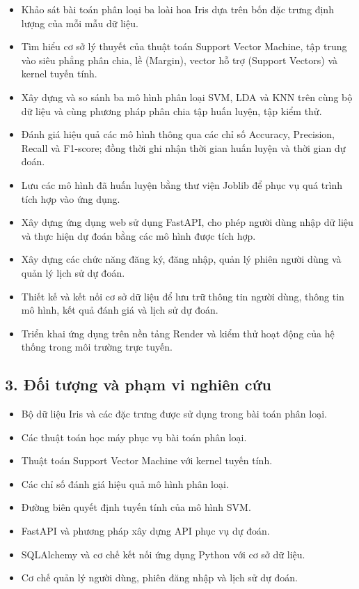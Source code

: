 \documentclass[14pt]{extarticle}
\begin{document}
\begin{itemize}
	\item Khảo sát bài toán phân loại ba loài hoa Iris dựa trên bốn đặc trưng định lượng của mỗi mẫu dữ liệu.
	
	\item Tìm hiểu cơ sở lý thuyết của thuật toán Support Vector Machine, tập trung vào siêu phẳng phân chia, lề (Margin), vector hỗ trợ (Support Vectors) và kernel tuyến tính.
	
	\item Xây dựng và so sánh ba mô hình phân loại SVM, LDA và KNN trên cùng bộ dữ liệu và cùng phương pháp phân chia tập huấn luyện, tập kiểm thử.
	
	\item Đánh giá hiệu quả các mô hình thông qua các chỉ số Accuracy, Precision, Recall và F1-score; đồng thời ghi nhận thời gian huấn luyện và thời gian dự đoán.
	
	\item Lưu các mô hình đã huấn luyện bằng thư viện Joblib để phục vụ quá trình tích hợp vào ứng dụng.
	
	\item Xây dựng ứng dụng web sử dụng FastAPI, cho phép người dùng nhập dữ liệu và thực hiện dự đoán bằng các mô hình được tích hợp.
	
	\item Xây dựng các chức năng đăng ký, đăng nhập, quản lý phiên người dùng và quản lý lịch sử dự đoán.
	
	\item Thiết kế và kết nối cơ sở dữ liệu để lưu trữ thông tin người dùng, thông tin mô hình, kết quả đánh giá và lịch sử dự đoán.
	
	\item Triển khai ứng dụng trên nền tảng Render và kiểm thử hoạt động của hệ thống trong môi trường trực tuyến.
\end{itemize}
\subsection*{3. Đối tượng và phạm vi nghiên cứu}
	
\begin{itemize}
	\item Bộ dữ liệu Iris và các đặc trưng được sử dụng trong bài toán phân loại.
	\item Các thuật toán học máy phục vụ bài toán phân loại.
	\item Thuật toán Support Vector Machine với kernel tuyến tính.
	\item Các chỉ số đánh giá hiệu quả mô hình phân loại.
	\item Đường biên quyết định tuyến tính của mô hình SVM.
	\item FastAPI và phương pháp xây dựng API phục vụ dự đoán.
	\item SQLAlchemy và cơ chế kết nối ứng dụng Python với cơ sở dữ liệu.
	\item Cơ chế quản lý người dùng, phiên đăng nhập và lịch sử dự đoán.
\end{itemize}
\end{document}
